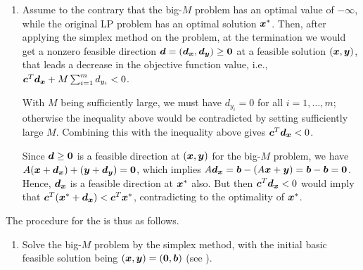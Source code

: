\begin{enumerate}
\begin{pf}
\begin{enumerate}
\item Assume to the contrary that the big-\(M\) problem has an optimal value of
\(-\infty\), while the original LP problem has an optimal solution
\(\bm{x}^*\). Then, after applying the simplex method on the problem, at the
termination we would get a nonzero feasible direction
\(\bm{d}=(\bm{d}_{\bm{x}},\bm{d}_{\bm{y}})\ge\bm{0}\) at a feasible
solution \((\bm{x},\bm{y})\), that leads a decrease in the objective
function value, i.e.,
\(\bm{c}^{T}\bm{d}_{\bm{x}}+M\sum_{i=1}^{m}d_{y_i}<0\).

With \(M\) being sufficiently large, we must have \(d_{y_i}=0\) for all
\(i=1,\dotsc,m\); otherwise the inequality above would be contradicted by
setting sufficiently large \(M\). Combining this with the inequality above
gives \(\bm{c}^{T}\bm{d}_{\bm{x}}<0\).

Since \(\bm{d}\ge\bm{0}\) is a feasible direction at \((\bm{x},\bm{y})\) for the
big-\(M\) problem, we have
\(A(\bm{x}+\bm{d}_{\bm{x}})+(\bm{y}+\bm{d}_{\bm{y}})=\bm{0}\),
which implies
\(A\bm{d}_{\bm{x}}=\bm{b}-(A\bm{x}+\bm{y})=\bm{b}-\bm{b}=\bm{0}\).
Hence, \(\bm{d}_{\bm{x}}\) is a feasible direction at \(\bm{x}^*\) also.
But then \(\bm{c}^{T}\bm{d}_{\bm{x}}<0\) would imply that
\(\bm{c}^{T}(\bm{x}^{*}+\bm{d}_{\bm{x}})<\bm{c}^{T}\bm{x}^{*}\),
contradicting to the optimality of \(\bm{x}^{*}\).
\end{enumerate}
\end{pf}

The procedure for the  is thus as follows.
\begin{enumerate}[label={(\arabic*)}]
\item Solve the big-\(M\) problem by the simplex method, with the initial basic
feasible solution being \((\bm{x},\bm{y})=(\bm{0},\bm{b})\) (see
).


\end{enumerate}
\end{enumerate}
